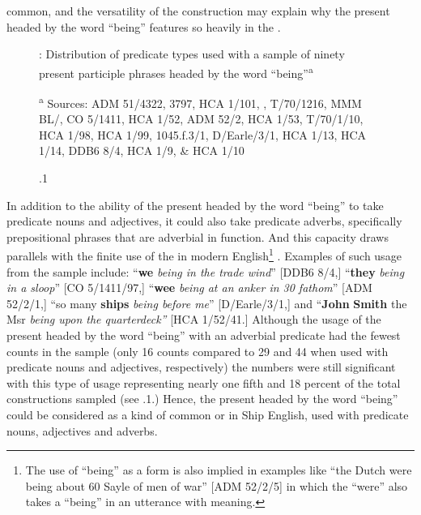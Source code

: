 common, and the versatility of the construction may explain why the present  headed by the word “being” features so heavily in the . 

  
\begin{figure}

\caption{\label{fig:key:5}.1}: Distribution of predicate types used with a sample of ninety present participle phrases headed by the word “being”\textsuperscript{a} 

\textsuperscript{a} Sources: ADM 51/4322, 3797, HCA 1/101, \citealt{Brown2011}, T/70/1216, MMM BL/\citealt{Egerton2395}, CO 5/1411, HCA 1/52, ADM 52/2, HCA 1/53, T/70/1/10, HCA 1/98, HCA 1/99, 1045.f.3/1, D/Earle/3/1, HCA 1/13, HCA 1/14, DDB6 8/4, HCA 1/9, \& HCA 1/10
\end{figure}


In addition to the ability of the present  headed by the word “being” to take predicate nouns and adjectives, it could also take predicate adverbs, specifically prepositional phrases that are adverbial in function. And this capacity draws parallels with the finite use of the  in modern English\footnote{The use of “being” as a  form is also implied in examples like “the Dutch were being about 60 Sayle of men of war” [ADM 52/2/5] in which the  “were” also takes a  “being” in an utterance with  meaning.} . Examples of such usage from the sample include: “\textbf{we} \textit{being in the trade wind}” [DDB6 8/4,] “\textbf{they} \textit{being in a sloop}” [CO 5/1411/97,] “\textbf{wee} \textit{being at an anker in 30 fathom}” [ADM 52/2/1,] “so many \textbf{ships} \textit{being before me}” [D/Earle/3/1,] and “\textbf{John} \textbf{Smith} the Msr \textit{being upon the quarterdeck”} [HCA 1/52/41.] Although the usage of the present  headed by the word “being” with an adverbial predicate had the fewest counts in the sample (only 16 counts compared to 29 and 44 when used with predicate nouns and adjectives, respectively) the numbers were still significant with this type of usage representing nearly one fifth and 18 percent of the total constructions sampled (see .1.) Hence, the present  headed by the word “being” could be considered as a kind of common  or  in Ship English, used with predicate nouns, adjectives and adverbs. 

